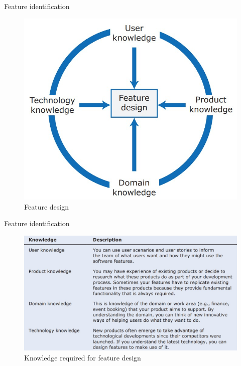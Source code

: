 \documentclass{beamer}
\begin{document}
\begin{frame}{Feature identification}
	\begin{figure}
		\includegraphics[scale=.45]{img/m2_28.jpg}
		\caption{Feature design}
	\end{figure}
\end{frame}
\begin{frame}{Feature identification}
	\begin{figure}
		\includegraphics[scale=.45]{img/m2_29.jpg}
		\caption{Knowledge required for feature design}
	\end{figure}
\end{frame}
\end{document}
